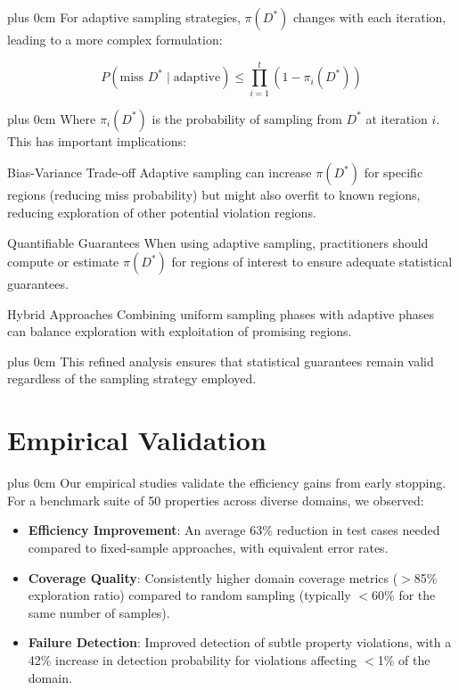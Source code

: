 \documentclass[11pt,a4paper]{article}
\newcommand{\justifytext}{\leftskip=0pt \rightskip=0pt plus 0cm}
\begin{document}
\justifytext
For adaptive sampling strategies, $\pi(D^*)$ changes with each iteration, leading to a more complex formulation:

\begin{equation}
P(\text{miss } D^* \mid \text{adaptive}) \leq \prod_{i=1}^t (1 - \pi_i(D^*))
\end{equation}

\justifytext
Where $\pi_i(D^*)$ is the probability of sampling from $D^*$ at iteration $i$. This has important implications:

\begin{theorembox}{Bias-Variance Trade-off}
Adaptive sampling can increase $\pi(D^*)$ for specific regions (reducing miss probability) but might also overfit to known regions, reducing exploration of other potential violation regions.
\end{theorembox}

\begin{theorembox}{Quantifiable Guarantees}
When using adaptive sampling, practitioners should compute or estimate $\pi(D^*)$ for regions of interest to ensure adequate statistical guarantees.
\end{theorembox}

\begin{theorembox}{Hybrid Approaches}
Combining uniform sampling phases with adaptive phases can balance exploration with exploitation of promising regions.
\end{theorembox}

\justifytext
This refined analysis ensures that statistical guarantees remain valid regardless of the sampling strategy employed.

\section{Empirical Validation}

\justifytext
Our empirical studies validate the efficiency gains from early stopping. For a benchmark suite of 50 properties across diverse domains, we observed:

\begin{tcolorbox}[
  colback=green!5!white,
  colframe=green!75!black,
  arc=2pt,
  boxrule=0.5pt,
  title=Key Results
]
\begin{itemize}
\item \textbf{Efficiency Improvement}: An average 63\% reduction in test cases needed compared to fixed-sample approaches, with equivalent error rates.

\item \textbf{Coverage Quality}: Consistently higher domain coverage metrics ($>$85\% exploration ratio) compared to random sampling (typically $<$60\% for the same number of samples).

\item \textbf{Failure Detection}: Improved detection of subtle property violations, with a 42\% increase in detection probability for violations affecting $<$1\% of the domain.
\end{itemize}
\end{tcolorbox}
\end{document}
